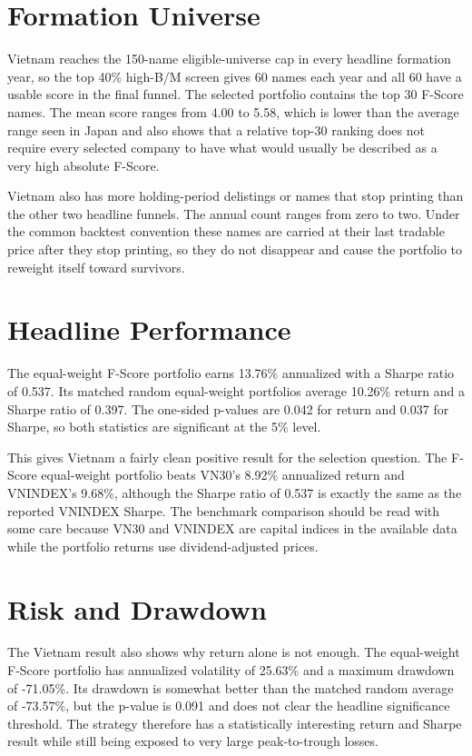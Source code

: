 \documentclass[11pt,a4paper]{report}
\numberwithin{figure}{chapter}
\numberwithin{table}{chapter}
\numberwithin{equation}{chapter}
\begin{document}
\section{Formation Universe}

Vietnam reaches the 150-name eligible-universe cap in every headline formation year, so the top 40\% high-B/M screen gives 60 names each year and all 60 have a usable score in the final funnel. The selected portfolio contains the top 30 F-Score names. The mean score ranges from 4.00 to 5.58, which is lower than the average range seen in Japan and also shows that a relative top-30 ranking does not require every selected company to have what would usually be described as a very high absolute F-Score.

Vietnam also has more holding-period delistings or names that stop printing than the other two headline funnels. The annual count ranges from zero to two. Under the common backtest convention these names are carried at their last tradable price after they stop printing, so they do not disappear and cause the portfolio to reweight itself toward survivors.

\section{Headline Performance}

The equal-weight F-Score portfolio earns 13.76\% annualized with a Sharpe ratio of 0.537. Its matched random equal-weight portfolios average 10.26\% return and a Sharpe ratio of 0.397. The one-sided p-values are 0.042 for return and 0.037 for Sharpe, so both statistics are significant at the 5\% level.

This gives Vietnam a fairly clean positive result for the selection question. The F-Score equal-weight portfolio beats VN30's 8.92\% annualized return and VNINDEX's 9.68\%, although the Sharpe ratio of 0.537 is exactly the same as the reported VNINDEX Sharpe. The benchmark comparison should be read with some care because VN30 and VNINDEX are capital indices in the available data while the portfolio returns use dividend-adjusted prices.

\section{Risk and Drawdown}

The Vietnam result also shows why return alone is not enough. The equal-weight F-Score portfolio has annualized volatility of 25.63\% and a maximum drawdown of -71.05\%. Its drawdown is somewhat better than the matched random average of -73.57\%, but the p-value is 0.091 and does not clear the headline significance threshold. The strategy therefore has a statistically interesting return and Sharpe result while still being exposed to very large peak-to-trough losses.
\end{document}
